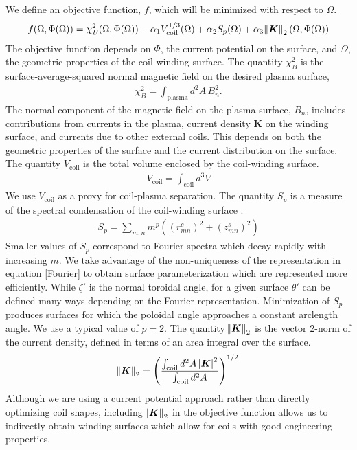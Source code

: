 \documentclass[aps,unsortedaddress]{revtex4-1}
\begin{document}
We define an objective function, $f$, which will be minimized with respect to $\Omega$. 
\begin{gather}
f(\Omega, \Phi(\Omega))  = \chi^2_B(\Omega, \Phi(\Omega)) - \alpha_1 V_{\text{coil}}^{1/3}(\Omega) + \alpha_2 S_p(\Omega) + \alpha_3  \norm{\bm{K}}_2(\Omega, \Phi(\Omega))
\label{objective_function}
\end{gather}
The objective function depends on $\Phi$, the current potential on the surface, and $\Omega$, the geometric properties of the coil-winding surface. The quantity $\chi^2_B$ is the surface-average-squared normal magnetic field on the desired plasma surface,
\begin{gather}
\chi^2_B = \int_{\text{plasma}} d^2 A \, B_n^2.
\label{chi2_B}
\end{gather}
The normal component of the magnetic field on the plasma surface, $B_n$, includes contributions from currents in the plasma, current density $\bm{K}$ on the winding surface, and currents due to other external coils. This depends on both the geometric properties of the surface and the current distribution on the surface. The quantity $V_{\text{coil}}$ is the total volume enclosed by the coil-winding surface.
\begin{gather}
V_{\text{coil}} = \int_{\text{coil}} d^3 V
\end{gather}
We use $V_{\text{coil}}$ as a proxy for coil-plasma separation. The quantity $S_p$ is a measure of the spectral condensation of the coil-winding surface \cite{Hirshman1985}. 
\begin{gather}
S_p = \sum_{m,n} m^{p} \left( (r_{mn}^c)^2 + (z_{mn}^s)^2 \right)
\end{gather}
Smaller values of $S_p$ correspond to Fourier spectra which decay rapidly with increasing $m$. We take advantage of the non-uniqueness of the representation in equation \ref{Fourier} to obtain surface parameterization which are represented more efficiently. While $\zeta'$ is the normal toroidal angle, for a given surface $\theta'$ can be defined many ways depending on the Fourier representation. %
Minimization of $S_p$ produces surfaces for which the poloidal angle approaches a constant arclength angle. We use a typical value of $p=2$. The quantity $\norm{\bm{K}}_2$ is the vector 2-norm of the current density, defined in terms of an area integral over the surface. 
\begin{gather}
\norm{\bm{K}}_2 = \left( \frac{\int_{\text{coil}} d^2 A \, \abs{\bm{K}}^2}{\int_{\text{coil}} d^2 A}  \right)^{1/2}
\end{gather}
Although we are using a current potential approach rather than directly optimizing coil shapes, including $\norm{\bm{K}}_2$ in the objective function allows us to indirectly obtain winding surfaces which allow for coils with good engineering properties. 
\end{document}
